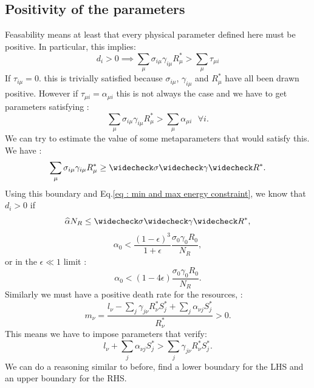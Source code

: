 \documentclass[12pt, titlepage]{report}
\begin{document}
\subsection{Positivity of the parameters}
Feasability means at least that every physical parameter defined here must be positive. In particular, this implies:
\begin{equation}
  d_i > 0 \implies \sum_\mu \sigma_{i\mu}\gamma_{i\mu}R^*_\mu > \sum_\mu \tau_{\mu i}
\end{equation}
If $\tau_{i\mu} = 0.$ this is trivially satisfied because $\sigma_{i\mu}$, $\gamma_{i\mu}$ and $R^*_\mu$ have all been drawn positive. However if $\tau_{\mu i} = \alpha_{\mu i}$ this is not always the case and we have to get parameters satisfying :
\begin{equation}
  \sum_\mu \sigma_{i \mu} \gamma_{i\mu}R^*_\mu > \sum_{\mu} \alpha_{\mu i}\text{ }\forall i.
\end{equation}
We can try to estimate the value of some metaparameters that would satisfy this.
We have :
\begin{equation}
  \sum_\mu \sigma_{i\mu} \gamma_{i\mu} R^*_\mu \geq \mind{\sigma}\mind{\gamma}\mind{R^*}.
\end{equation}
Using this boundary and Eq.\eqref{eq : min and max energy constraint}, we know that $d_i>0$ if
\begin{equation}
  \maxd{\alpha}N_R \leq \mind{\sigma} \mind{\gamma}\mind{R^*},
\end{equation}
\ie
\begin{equation}
  \alpha_0 < \frac{\left(1-\epsilon\right)^3}{1+\epsilon} \frac{\sigma_0 \gamma_0 R_0}{N_R},
\end{equation}
or in the $\epsilon \ll 1$ limit :
\begin{equation}
  \alpha_0 < \left(1-4\epsilon\right)\frac{\sigma_0 \gamma_0 R_0}{N_R}.
\end{equation}
Similarly we must have a positive death rate for the resources, \ie:
\begin{equation}
  m_\nu = \frac{l_\nu-\sum_j \gamma_{j\nu} R^*_\nu S^*_j+\sum_j \alpha_{\nu j} S^*_j}{R^*_\nu} > 0. \label{eq : positive m_nu}
\end{equation}
This means we have to impose parameters that verify:
\begin{equation}
  l_\nu + \sum_j \alpha_{\nu j}S^*_j > \sum_j \gamma_{j \nu}R^*_\nu S^*_j.
\end{equation}
We can do a reasoning similar to before, \ie find a lower boundary for the LHS and an upper boundary for the RHS.
\end{document}

